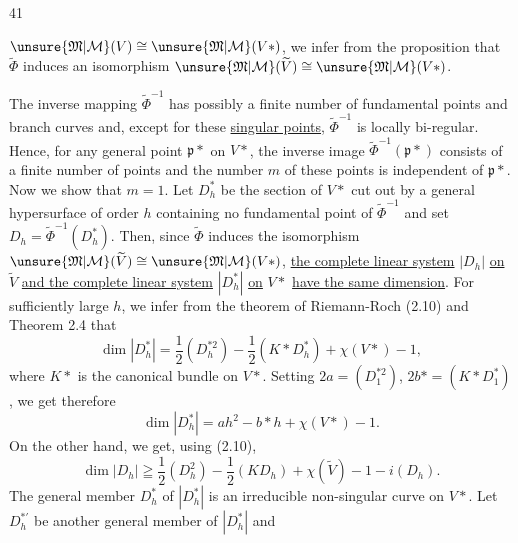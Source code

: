 \begin{center}41\end{center}
$\unsure{\mathfrak M|\mathcal M}(V)\cong\unsure{\mathfrak M|\mathcal M}(V*)$, we infer from the proposition  that $\widetilde\Phi$ induces an isomorphism $\unsure{\mathfrak M|\mathcal M}(\widetilde V)\cong\unsure{\mathfrak M|\mathcal M}(V*)$.

The inverse mapping $\widetilde\Phi^{-1}$ has possibly a finite number of fundamental points and branch curves and, except for these \uline{singular points}, $\widetilde\Phi^{-1}$ is locally bi-regular. Hence, for any general point $\mathfrak p*$ on $V*$, the inverse image $\widetilde\Phi^{-1}(\mathfrak p*)$ consists of a finite number of points and the number $m$ of these points is independent of $\mathfrak p*$. Now we show that $m=1$. Let $D_h^*$ be the section of $V*$ cut out by a general hypersurface of order $h$ containing no fundamental point of $\widetilde\Phi^{-1}$ and set $D_h=\widetilde\Phi^{-1}(D_h^*)$. Then, since $\widetilde\Phi$ induces the isomorphism $\unsure{\mathfrak M|\mathcal M}(\widetilde V)\cong\unsure{\mathfrak M|\mathcal M}(V*)$, \uline{the complete linear system} $|D_h|$ \uline{on} $\widetilde V$ \uline{and the complete linear system} $|D_h^*|$ \uline{on} $V*$ \uline{have the same dimension}. For sufficiently large $h$, we infer from the theorem of Riemann-Roch (2.10) and Theorem 2.4 that
\[
\dim|D_h^*|=\frac12(D_h^{*2})-\frac12(K*D_h^*)+\chi(V*)-1,
\]
where $K*$ is the canonical bundle on $V*$. Setting $2a=(D_1^{*2})$, $2b*=(K*D_1^*)$, we get therefore
\[
\dim|D_h^*|=ah^2-b*h+\chi(V*)-1.
\]
On the other hand, we get, using (2.10),
\[
\dim|D_h|\geqq\frac12(D_h^2)-\frac12(KD_h)+\chi(\widetilde V)-1-i(D_h).
\]
The general member $D_h^*$ of $|D_h^*|$ is an irreducible non-singular curve on $V*$. Let $D_h^{*\prime}$ be another general member of $|D_h^*|$ and

